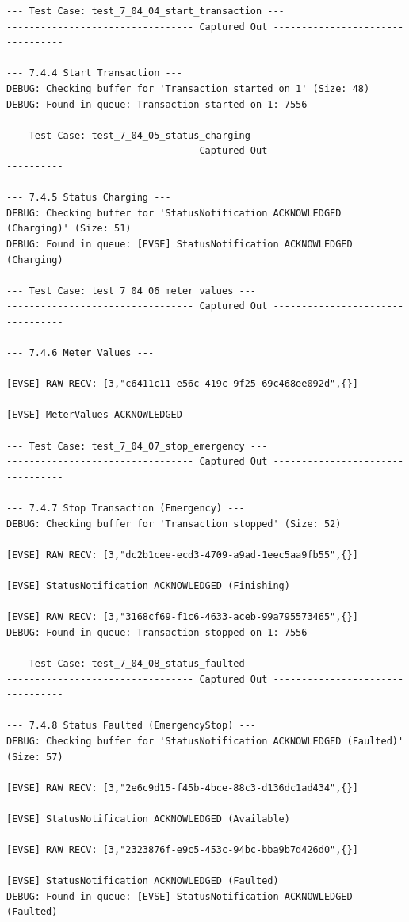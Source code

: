 \documentclass{article}
\begin{document}
\begin{lstlisting}
--- Test Case: test_7_04_04_start_transaction ---
--------------------------------- Captured Out ---------------------------------

--- 7.4.4 Start Transaction ---
DEBUG: Checking buffer for 'Transaction started on 1' (Size: 48)
DEBUG: Found in queue: Transaction started on 1: 7556

--- Test Case: test_7_04_05_status_charging ---
--------------------------------- Captured Out ---------------------------------

--- 7.4.5 Status Charging ---
DEBUG: Checking buffer for 'StatusNotification ACKNOWLEDGED (Charging)' (Size: 51)
DEBUG: Found in queue: [EVSE] StatusNotification ACKNOWLEDGED (Charging)

--- Test Case: test_7_04_06_meter_values ---
--------------------------------- Captured Out ---------------------------------

--- 7.4.6 Meter Values ---

[EVSE] RAW RECV: [3,"c6411c11-e56c-419c-9f25-69c468ee092d",{}]

[EVSE] MeterValues ACKNOWLEDGED

--- Test Case: test_7_04_07_stop_emergency ---
--------------------------------- Captured Out ---------------------------------

--- 7.4.7 Stop Transaction (Emergency) ---
DEBUG: Checking buffer for 'Transaction stopped' (Size: 52)

[EVSE] RAW RECV: [3,"dc2b1cee-ecd3-4709-a9ad-1eec5aa9fb55",{}]

[EVSE] StatusNotification ACKNOWLEDGED (Finishing)

[EVSE] RAW RECV: [3,"3168cf69-f1c6-4633-aceb-99a795573465",{}]
DEBUG: Found in queue: Transaction stopped on 1: 7556

--- Test Case: test_7_04_08_status_faulted ---
--------------------------------- Captured Out ---------------------------------

--- 7.4.8 Status Faulted (EmergencyStop) ---
DEBUG: Checking buffer for 'StatusNotification ACKNOWLEDGED (Faulted)' (Size: 57)

[EVSE] RAW RECV: [3,"2e6c9d15-f45b-4bce-88c3-d136dc1ad434",{}]

[EVSE] StatusNotification ACKNOWLEDGED (Available)

[EVSE] RAW RECV: [3,"2323876f-e9c5-453c-94bc-bba9b7d426d0",{}]

[EVSE] StatusNotification ACKNOWLEDGED (Faulted)
DEBUG: Found in queue: [EVSE] StatusNotification ACKNOWLEDGED (Faulted)


\end{lstlisting}
\end{document}
